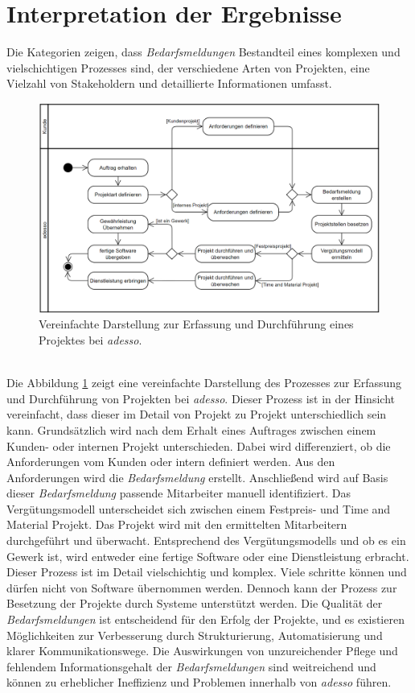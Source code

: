 \section{Interpretation der Ergebnisse}
Die Kategorien zeigen, dass \emph{Bedarfsmeldungen} Bestandteil eines komplexen und vielschichtigen Prozesses sind, der verschiedene Arten von Projekten, eine Vielzahl von Stakeholdern und detaillierte Informationen umfasst. 
\begin{figure}[h]%
	\centering  
	\includegraphics[scale=0.8]{Abbildungen/bedarfsmeldungsprozess.png}
	\caption{Vereinfachte Darstellung zur Erfassung und Durchführung eines Projektes bei \emph{adesso}.}
	\label{fig:bedarfsmeldungsprozess}
\end{figure}\mbox{} \\
Die Abbildung \ref{fig:bedarfsmeldungsprozess} zeigt eine vereinfachte Darstellung des Prozesses zur Erfassung und Durchführung von Projekten bei \emph{adesso}. Dieser Prozess ist in der Hinsicht vereinfacht, dass dieser im Detail von Projekt zu Projekt unterschiedlich sein kann. Grundsätzlich wird nach dem Erhalt eines Auftrages zwischen einem Kunden- oder internen Projekt unterschieden. Dabei wird differenziert, ob die Anforderungen vom Kunden oder intern definiert werden. Aus den Anforderungen wird die \emph{Bedarfsmeldung} erstellt. Anschließend wird auf Basis dieser \emph{Bedarfsmeldung} passende Mitarbeiter manuell identifiziert. Das Vergütungsmodell unterscheidet sich zwischen einem Festpreis- und Time and Material Projekt. Das Projekt wird mit den ermittelten Mitarbeitern durchgeführt und überwacht. Entsprechend des Vergütungsmodells und ob es ein Gewerk ist, wird entweder eine fertige Software oder eine Dienstleistung erbracht. Dieser Prozess ist im Detail vielschichtig und komplex. Viele schritte können und dürfen nicht von Software übernommen werden. Dennoch kann der Prozess zur Besetzung der Projekte durch Systeme unterstützt werden. Die Qualität der \emph{Bedarfsmeldungen} ist entscheidend für den Erfolg der Projekte, und es existieren Möglichkeiten zur Verbesserung durch Strukturierung, Automatisierung und klarer Kommunikationswege. Die Auswirkungen von unzureichender Pflege und fehlendem Informationsgehalt der \emph{Bedarfsmeldungen} sind weitreichend und können zu erheblicher Ineffizienz und Problemen innerhalb von \emph{adesso} führen.
